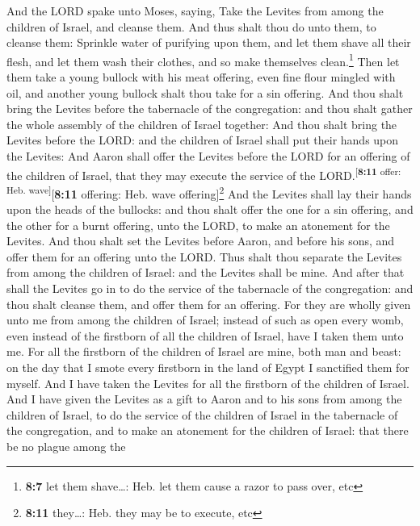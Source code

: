  And the LORD spake unto Moses, saying, 
Take the Levites from among the children of Israel, and cleanse them.
 And thus shalt thou do unto them, to cleanse them:
Sprinkle water of purifying upon them, and let them shave all their
flesh, and let them wash their clothes, and so make themselves
clean.\footnote{\textbf{8:7} let them shave\ldots: Heb. let them cause a
  razor to pass over, etc}  Then let them take a young
bullock with his meat offering, even fine flour mingled with oil, and
another young bullock shalt thou take for a sin offering. 
And thou shalt bring the Levites before the tabernacle of the
congregation: and thou shalt gather the whole assembly of the children
of Israel together:  And thou shalt bring the Levites
before the LORD: and the children of Israel shall put their hands upon
the Levites:  And Aaron shall offer the Levites before
the LORD for an offering of the children of Israel, that they may
execute the service of the LORD.\textsuperscript{{[}\textbf{8:11} offer:
Heb. wave{]}}{[}\textbf{8:11} offering: Heb. wave offering{]}\footnote{\textbf{8:11}
  they\ldots: Heb. they may be to execute, etc}  And the
Levites shall lay their hands upon the heads of the bullocks: and thou
shalt offer the one for a sin offering, and the other for a burnt
offering, unto the LORD, to make an atonement for the Levites.
 And thou shalt set the Levites before Aaron, and before
his sons, and offer them for an offering unto the LORD. 
Thus shalt thou separate the Levites from among the children of Israel:
and the Levites shall be mine.  And after that shall the
Levites go in to do the service of the tabernacle of the congregation:
and thou shalt cleanse them, and offer them for an offering.
 For they are wholly given unto me from among the
children of Israel; instead of such as open every womb, even instead of
the firstborn of all the children of Israel, have I taken them unto me.
 For all the firstborn of the children of Israel are
mine, both man and beast: on the day that I smote every firstborn in the
land of Egypt I sanctified them for myself.  And I have
taken the Levites for all the firstborn of the children of Israel.
 And I have given the Levites as a gift to Aaron and to
his sons from among the children of Israel, to do the service of the
children of Israel in the tabernacle of the congregation, and to make an
atonement for the children of Israel: that there be no plague among the
